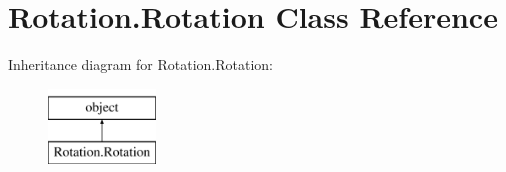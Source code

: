 \hypertarget{class_rotation_1_1_rotation}{}\section{Rotation.\+Rotation Class Reference}
\label{class_rotation_1_1_rotation}
Inheritance diagram for Rotation.\+Rotation\+:\begin{figure}[H]
\begin{center}
\leavevmode
\includegraphics[height=2.000000cm]{class_rotation_1_1_rotation}
\end{center}
\end{figure}
